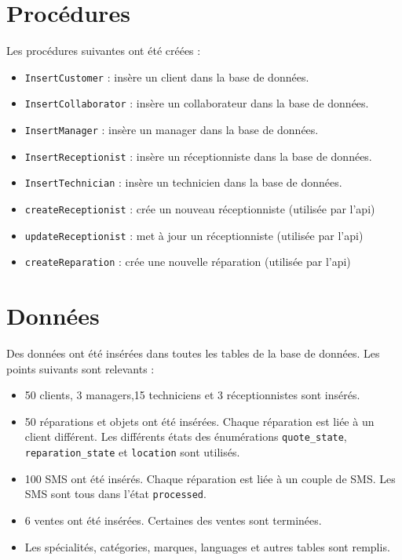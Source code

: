 \documentclass{article}
\newcommand{\ttt}{\texttt}
\begin{document}
    \section{Procédures}

    Les procédures suivantes ont été créées :
    \begin{itemize}
        \item \ttt{InsertCustomer} : insère un client dans la base de données.
        \item \ttt{InsertCollaborator} : insère un collaborateur dans la base de données.
        \item \ttt{InsertManager} : insère un manager dans la base de données.
        \item \ttt{InsertReceptionist} : insère un réceptionniste dans la base de données.
        \item \ttt{InsertTechnician} : insère un technicien dans la base de données.
        \item \ttt{createReceptionist} : crée un nouveau réceptionniste (utilisée par l'api)
        \item \ttt{updateReceptionist} : met à jour un réceptionniste (utilisée par l'api)
        \item \ttt{createReparation} : crée une nouvelle réparation (utilisée par l'api)
    \end{itemize}


    \section{Données}

    Des données ont été insérées dans toutes les tables de la base de données. Les points suivants sont relevants :
    \begin{itemize}
        \item 50 clients, 3 managers,15 techniciens et 3 réceptionnistes sont insérés.
        \item 50 réparations et objets ont été insérées. Chaque réparation est liée à un client différent. Les différents états des énumérations \ttt{quote\_state}, \ttt{reparation\_state} et \ttt{location} sont utilisés.
        \item 100 SMS ont été insérés. Chaque réparation est liée à un couple de SMS. Les SMS sont tous dans l'état \ttt{processed}.
        \item 6 ventes ont été insérées. Certaines des ventes sont terminées.
        \item Les spécialités, catégories, marques, languages et autres tables sont remplis.
    \end{itemize}
\end{document}
